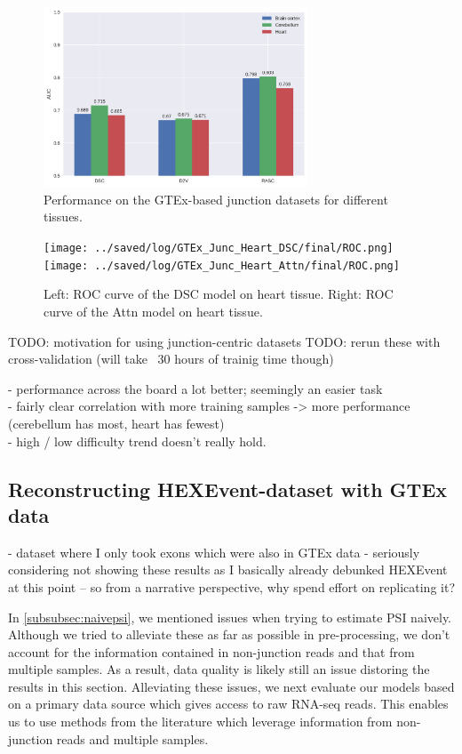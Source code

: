 \begin{figure}[h]
	\centering\includegraphics[width=0.7\textwidth]{../visualizations/ch5-results/gtex_junc_barcharts.png} 
	\caption{Performance on the GTEx-based junction datasets for different tissues. }
	\label{fig:gtex_junc_barcharts}
\end{figure}

\begin{figure}[h]
	\texttt{[image: ../saved/log/GTEx\_Junc\_Heart\_DSC/final/ROC.png]} 
	\texttt{[image: ../saved/log/GTEx\_Junc\_Heart\_Attn/final/ROC.png]}
	\caption{Left: ROC curve of the DSC model on heart tissue. Right: ROC curve of the Attn model on heart tissue. }
	\label{fig:gtex_junc_rocs}
\end{figure}
TODO: motivation for using junction-centric datasets
TODO: rerun these with cross-validation (will take ~30 hours of trainig time though)

- performance across the board a lot better; seemingly an easier task\\
- fairly clear correlation with more training samples -> more performance (cerebellum has most, heart has fewest)\\
- high / low difficulty trend doesn't really hold. 


\subsection{Reconstructing HEXEvent-dataset with GTEx data}
- dataset where I only took exons which were also in GTEx data
- seriously considering not showing these results as I basically already debunked HEXEvent at this point -- so from a narrative perspective, why spend effort on replicating it?



In \ref{subsubsec:naivepsi}, we mentioned issues when trying to estimate PSI naively. Although we tried to alleviate these as far as possible in pre-processing, we don't account for the information contained in non-junction reads and that from multiple samples. As a result, data quality is likely still an issue distoring the results in this section. Alleviating these issues, we next evaluate our models based on a primary data source which gives access to raw RNA-seq reads. This enables us to use methods from the literature which leverage information from non-junction reads and multiple samples.

